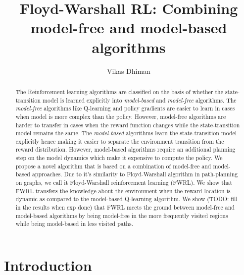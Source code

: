 \documentclass[letterpaper]{article} %
\title{Floyd-Warshall RL: Combining model-free and model-based algorithms}
\author{Vikas Dhiman}
\newcommand{\TODO}[1]{{\color{red}TODO: {#1}}}
\begin{document}
\maketitle
\begin{abstract}
The Reinforcement learning algorithms are classified on the basis of whether
the state-transition model is learned explicitly into \emph{model-based}
and \emph{model-free} algorithms.
%
The \emph{model-free} algorithms like Q-learning and policy gradients are easier to learn in cases when model is more complex than the policy.
However, model-free algorithms are harder to transfer in cases when the reward function changes while the state-transition model remains the same.
The \emph{model-based} algorithms learn the state-transition model explicitly hence making it
easier to separate the environment transition from the reward distribution.
However, model-based algorithms require an additional planning step on the model dynamics
which make it expensive to compute the policy.
%
We propose a novel algorithm that is based on a combination of model-free and model-based approaches.
Due to it's similarity to Floyd-Warshall algorithm in path-planning on graphs, we call
it Floyd-Warshall reinforcement learning (FWRL).
We show that FWRL transfers the knowledge about the environment when the reward location is dynamic as compared to the model-based Q-learning algorithm.
We show (\TODO{fill in the results when exp done}) that FWRL meets the ground between model-free and model-based algorithms by being model-free in the more frequently visited regions while being model-based in less visited paths.
\end{abstract}


\section{ Introduction}
\end{document}
